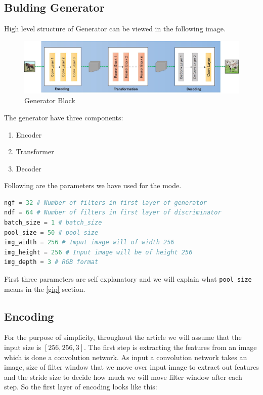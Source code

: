 \documentclass[peerreview]{IEEEtran}
\begin{document}
\subsection{Bulding Generator}
High level structure of Generator can be viewed in the following image.

\begin{figure}[H]
    \centering
    \includegraphics[width=0.8\columnwidth]{Generator.jpg}
    \caption{Generator Block}
    \label{fig:s=generator}
\end{figure}

The generator have three components:
\begin{enumerate}
  \item Encoder
  \item Transformer
  \item Decoder
\end{enumerate}
Following are the parameters we have used for the mode.

\begin{lstlisting}[language=Python]
ngf = 32 # Number of filters in first layer of generator
ndf = 64 # Number of filters in first layer of discriminator
batch_size = 1 # batch_size
pool_size = 50 # pool size
img_width = 256 # Imput image will of width 256
img_height = 256 # Input image will be of height 256
img_depth = 3 # RGB format
\end{lstlisting}

First three parameters are self explanatory and we will explain what \verb!pool_size! means in the \ref{gip} section.

\subsection{Encoding}
For the purpose of simplicity, throughout the article we will assume that the input size is $[256,256,3]$. The first step is extracting the features from an image which is done a convolution network. As input a convolution network takes an image, size of filter window that we move over input image to extract out features and the stride size to decide how much we will move filter window after each step. So the first layer of encoding looks like this:
\end{document}
